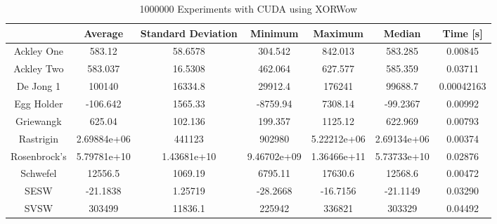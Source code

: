 \documentclass{article}
\begin{document}
        \begin{table}[h]
            \begin{centering}
                \begin{tabular}{|c||c|c|c|c|c|c|}
                    \hline
                                & Average & Standard Deviation & Minimum & Maximum & Median & Time [s] \\
                    \hline
                    \hline
                    Ackley One & 583.12 & 58.6578 & 304.542 & 842.013 & 583.285 & 0.00845 \\
                    \hline
                    Ackley Two & 583.037 & 16.5308 & 462.064 & 627.577 & 585.359 & 0.03711 \\
                    \hline
                    De Jong 1 & 100140 & 16334.8 & 29912.4 & 176241 & 99688.7 & 0.00042163\\
                    \hline
                    Egg Holder & -106.642 & 1565.33 & -8759.94 & 7308.14 & -99.2367 & 0.00992 \\
                    \hline
                    Griewangk & 625.04 & 102.136 & 199.357 & 1125.12 & 622.969 & 0.00793 \\
                    \hline
                    Rastrigin & 2.69884e+06 & 441123 & 902980 & 5.22212e+06 & 2.69134e+06 & 0.00374 \\
                    \hline
                    Rosenbrock's & 5.79781e+10 & 1.43681e+10 & 9.46702e+09 & 1.36466e+11 & 5.73733e+10 & 0.02876\\
                    \hline
                    Schwefel & 12556.5 & 1069.19 & 6795.11 & 17630.6 & 12568.6 & 0.00472 \\
                    \hline
                    SESW & -21.1838 & 1.25719 & -28.2668 & -16.7156 & -21.1149 & 0.03290 \\
                    \hline
                    SVSW & 303499 & 11836.1 & 225942 & 336821 & 303329 & 0.04492 \\
                    \hline
                \end{tabular}
                \caption{1000000 Experiments with CUDA using XORWow}
            \end{centering}
            \end{table}
\end{document}
